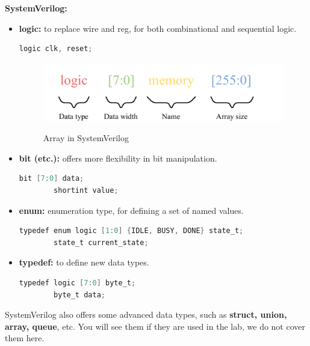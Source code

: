 \documentclass{article}
\begin{document}
\textbf{SystemVerilog:}
\begin{itemize}
    \item \textbf{logic:} to replace wire and reg, for both combinational and sequential logic.
    \begin{lstlisting}[language=Verilog,frame=single,backgroundcolor=\color{White},basicstyle=\color{LightGreen},showspaces=false,showstringspaces=false]
        logic clk, reset;
    \end{lstlisting}

    \begin{figure}[h]
        \centering
        \includegraphics[width=\textwidth]{figures/array.pdf}
        \label{fig:array}
        \caption{Array in SystemVerilog}
    \end{figure}
    \item \textbf{bit (etc.):} offers more flexibility in bit manipulation.
    \begin{lstlisting}[language=Verilog,frame=single,backgroundcolor=\color{White},basicstyle=\color{LightGreen},showspaces=false,showstringspaces=false]
        bit [7:0] data;
        shortint value;
    \end{lstlisting}
    \item \textbf{enum:} enumeration type, for defining a set of named values.
    \begin{lstlisting}[language=Verilog,frame=single,backgroundcolor=\color{White},basicstyle=\color{LightGreen},showspaces=false,showstringspaces=false]
        typedef enum logic [1:0] {IDLE, BUSY, DONE} state_t;
        state_t current_state;
    \end{lstlisting}
    \item \textbf{typedef:} to define new data types.
    \begin{lstlisting}[language=Verilog,frame=single,backgroundcolor=\color{White},basicstyle=\color{LightGreen},showspaces=false,showstringspaces=false]
        typedef logic [7:0] byte_t;
        byte_t data;
    \end{lstlisting}
\end{itemize}
SystemVerilog also offers some advanced data types, such as \textbf{struct, union, array, queue}, etc. You will see them if they are used in the lab, we do not cover them here.\\
\end{document}
